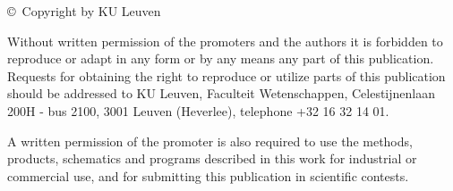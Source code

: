 \thispagestyle{empty}
\setlength{\parindent}{0cm}
\vspace*{\fill}
\rmfamily

\copyright\ Copyright by KU Leuven \par
Without written permission of the promoters and the authors it is forbidden to reproduce or adapt in any form or by any means any part of this publication. Requests for obtaining the right to reproduce or utilize parts of this publication should be addressed to KU Leuven, Faculteit Wetenschappen, Celestijnenlaan 200H - bus 2100, 3001 Leuven (Heverlee), telephone +32 16 32 14 01.

A written permission of the promoter is also required to use the methods, products, schematics and programs described in this work for industrial or commercial use, and for submitting this publication in scientific contests.

\setlength{\parindent}{0.5cm}
